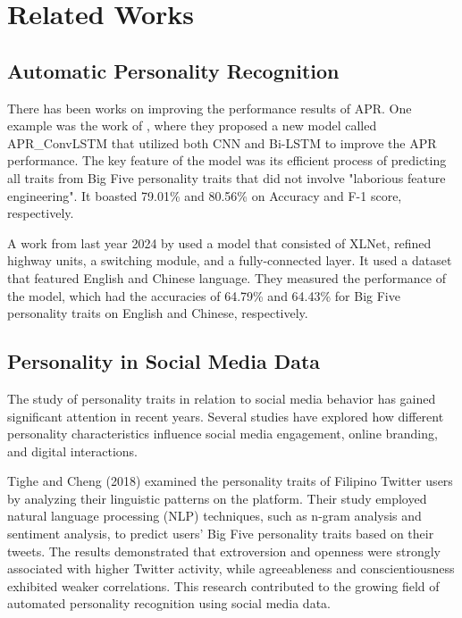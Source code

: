 %
%
%                 

\chapter{Related Works}
\label{sec:Related Works}

\section {Automatic Personality Recognition}
\label{sec: APRecognition}

There has been works on improving the performance results of APR. One example was the work of \citet{Aljuhani_Al_Malaise_Al_Ghamdi_Alghamdi_Saleem_2025}, where they proposed a new model called APR\_ConvLSTM that utilized both CNN and Bi-LSTM to improve the APR performance. The key feature of the model was its efficient process of predicting all traits from Big Five personality traits that did not involve "laborious feature engineering". It boasted 79.01\% and 80.56\% on Accuracy and F-1 score, respectively.

A work from last year 2024 by \citet{Chen_Tsai_Ha_2024} used a model that consisted of XLNet, refined highway units, a switching module, and a fully-connected layer. It used a dataset that featured English and Chinese language. They measured the performance of the model, which had the accuracies of 64.79\% and 64.43\% for Big Five personality traits on English and Chinese, respectively.

\section{Personality in Social Media Data}
\label{sec:Personality}
The study of personality traits in relation to social media behavior has gained significant attention in recent years. Several studies have explored how different personality characteristics influence social media engagement, online branding, and digital interactions.

Tighe and Cheng (2018) examined the personality traits of Filipino Twitter users by analyzing their linguistic patterns on the platform. Their study employed natural language processing (NLP) techniques, such as n-gram analysis and sentiment analysis, to predict users' Big Five personality traits based on their tweets. The results demonstrated that extroversion and openness were strongly associated with higher Twitter activity, while agreeableness and conscientiousness exhibited weaker correlations. This research contributed to the growing field of automated personality recognition using social media data.

